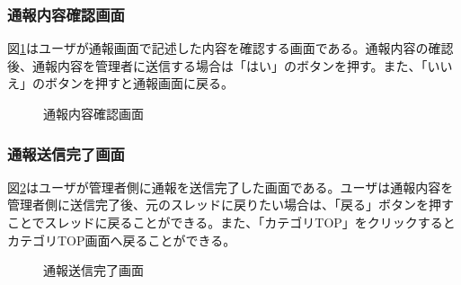 \documentclass[a4j]{jarticle}
\begin{document}
\subsubsection{通報内容確認画面}
図\ref{fig:report_confirm}はユーザが通報画面で記述した内容を確認する画面である。通報内容の確認後、通報内容を管理者に送信する場合は「はい」のボタンを押す。また、「いいえ」のボタンを押すと通報画面に戻る。
\begin{figure}[H]
\begin{center}
\caption{通報内容確認画面}
\label{fig:report_confirm}
\end{center}
\end{figure}

\subsubsection{通報送信完了画面}
図\ref{fig:report_ok}はユーザが管理者側に通報を送信完了した画面である。ユーザは通報内容を管理者側に送信完了後、元のスレッドに戻りたい場合は、「戻る」ボタンを押すことでスレッドに戻ることができる。また、「カテゴリTOP」をクリックするとカテゴリTOP画面へ戻ることができる。
\begin{figure}[H]
\begin{center}
\caption{通報送信完了画面}
\label{fig:report_ok}
\end{center}
\end{figure}
\end{document}
